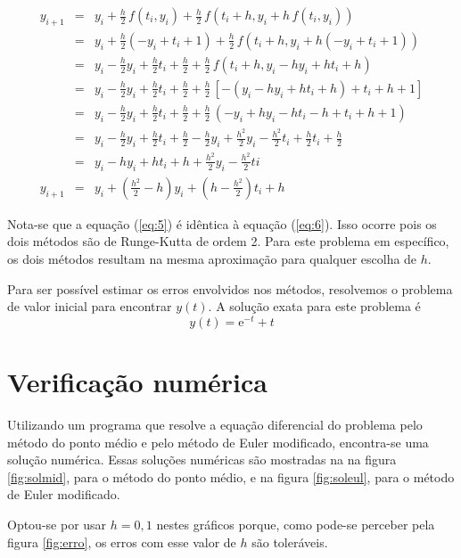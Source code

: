 \documentclass[brazilian, 12pt, a4paper, final]{article}
\begin{document}
\begin{eqnarray}
  y_{i+1}&=&y_i+\frac{h}{2}\, f(t_i,y_i)+\frac{h}{2}\, f(t_i+h,y_i+h\,f(t_i,y_i)) \nonumber \\
  &=&y_i+\frac{h}{2}(-y_i+t_i+1)+\frac{h}{2}\,f(t_i+h,y_i+h(-y_i+t_i+1)) \nonumber \\
  &=&y_i-\frac{h}{2}y_i+\frac{h}{2}t_i+\frac{h}{2}+\frac{h}{2}\,f(t_i+h,y_i-hy_i+ht_i+h) \nonumber \\
  &=&y_i-\frac{h}{2}y_i+\frac{h}{2}t_i+\frac{h}{2}+\frac{h}{2}\,[-(y_i-hy_i+ht_i+h)+t_i+h+1] \nonumber \\
  &=&y_i-\frac{h}{2}y_i+\frac{h}{2}t_i+\frac{h}{2}+\frac{h}{2}\,(-y_i+hy_i-ht_i-h+t_i+h+1) \nonumber \\
  &=&y_i-\frac{h}{2}y_i+\frac{h}{2}t_i+\frac{h}{2}-\frac{h}{2}y_i+\frac{h^2}{2}y_i-\frac{h^2}{2}t_i+\frac{h}{2}t_i+\frac{h}{2} \nonumber \\
  &=&y_i-hy_i+ht_i+h+\frac{h^2}{2}y_i-\frac{h^2}{2}ti \nonumber \\
  y_{i+1}&=&y_i+\left(\frac{h^2}{2}-h\right)y_i+\left(h-\frac{h^2}{2}\right)t_i+h \label{eq:6}
\end{eqnarray}

Nota-se que a equação (\ref{eq:5}) é idêntica à equação (\ref{eq:6}). Isso ocorre pois os dois métodos são de Runge-Kutta de ordem 2. Para este problema em específico, os dois métodos resultam na mesma aproximação para qualquer escolha de $h$.

Para ser possível estimar os erros envolvidos nos métodos, resolvemos o problema de valor inicial para encontrar $y(t)$. A solução exata para este problema é
\begin{equation}
  y(t)=\mathrm{e}^{-t}+t
\end{equation}

\section{Verificação numérica}
Utilizando um programa que resolve a equação diferencial do problema pelo método do ponto médio e pelo método de Euler modificado, encontra-se uma solução numérica. Essas soluções numéricas são mostradas na na figura \ref{fig:solmid}, para o método do ponto médio, e na figura \ref{fig:soleul}, para o método de Euler modificado.

Optou-se por usar $h=0,1$ nestes gráficos porque, como pode-se perceber pela figura \ref{fig:erro}, os erros com esse valor de $h$ são toleráveis.
\end{document}
